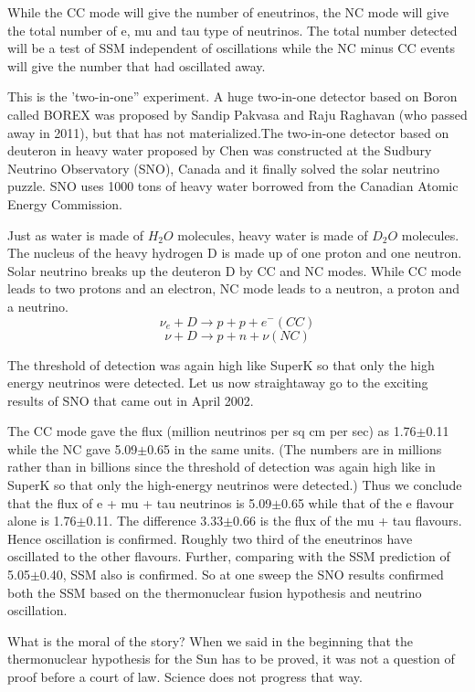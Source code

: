 While the CC mode will give the number of eneutrinos, the NC mode
will give the total number of e, mu and tau type of neutrinos. The total
number detected will be a test of SSM independent of oscillations while the
NC minus CC events will give the number that had oscillated away.

This is the ’two-in-one” experiment. A huge two-in-one detector based on
Boron called BOREX was proposed by Sandip Pakvasa and Raju Raghavan
(who passed away in 2011), but that has not materialized.The two-in-one
detector based on deuteron in heavy water proposed by Chen was constructed
at the Sudbury Neutrino Observatory (SNO), Canada and it finally solved
the solar neutrino puzzle. SNO uses 1000 tons of heavy water borrowed from
the Canadian Atomic Energy Commission.

Just as water is made of $H_{2}O$ molecules, heavy water is made of $D_{2}O$
molecules. The nucleus of the heavy hydrogen D is made up of one proton
and one neutron. Solar neutrino breaks up the deuteron D by CC and NC
modes. While CC mode leads to two protons and an electron, NC mode
leads to a neutron, a proton and a neutrino.
$$
\nu_{e} + D \rightarrow p + p + e^{-} (CC)
$$
$$
\nu + D \rightarrow p + n + \nu (NC)
$$

The threshold of detection was again high like SuperK so that only the
high energy neutrinos were detected. Let us now straightaway go to the
exciting results of SNO that came out in April 2002.

The CC mode gave the flux (million neutrinos per sq cm per sec) as
1.76$\pm$0.11 while the NC gave 5.09$\pm$0.65 in the same units. (The numbers are
in millions rather than in billions since the threshold of detection was again
high like in SuperK so that only the high-energy neutrinos were detected.)
Thus we conclude that the flux of e + mu + tau neutrinos is 5.09$\pm$0.65 while
that of the e flavour alone is 1.76$\pm$0.11. The difference 3.33$\pm$0.66 is the flux
of the mu + tau flavours. Hence oscillation is confirmed. Roughly two third
of the eneutrinos have oscillated to the other flavours. Further, comparing
with the SSM prediction of 5.05$\pm$0.40, SSM also is confirmed. So at one
sweep the SNO results confirmed both the SSM based on the thermonuclear
fusion hypothesis and neutrino oscillation.

What is the moral of the story? When we said in the beginning that
the thermonuclear hypothesis for the Sun has to be proved, it was not a
question of proof before a court of law. Science does not progress that way.

